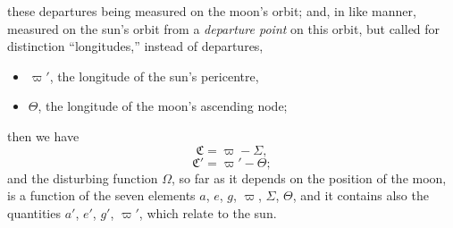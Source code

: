 \documentclass[11pt]{article}
\begin{document}
\bigskip
{} these departures being measured on the moon's orbit; and, in like manner, measured on the sun's orbit from a \emph{departure point} on this orbit, but called for distinction ``longitudes,'' instead of departures,
\begin{itemize}
\item[] $\varpi'$, the longitude of the sun's pericentre,
\item[] $\Theta$, the longitude of the moon's ascending node;
\end{itemize}
then we have
\[
\mathfrak{C} = \varpi - \Sigma,
\]
\[
\mathfrak{C}' = \varpi' - \Theta;
\]
and the disturbing function $\Omega$, so far as it depends on the position of the moon, is a function of the seven elements $a$, $e$, $g$, $\varpi$, $\Sigma$, $\Theta$, and it contains also the quantities $a'$, $e'$, $g'$, $\varpi'$, which relate to the sun.
\end{document}
